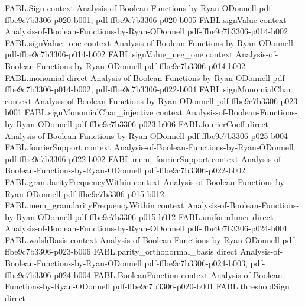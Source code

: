 \begin{theorem}
\label{FABL.hasCondorcetWinner_iff_isNAE3}
\leanok
{}
\proofstep
  {FABL.Sign}
  {context}
  {Analysis-of-Boolean-Functions-by-Ryan-ODonnell}
  {pdf-ffbe9c7b3306-p020-b001,
    pdf-ffbe9c7b3306-p020-b005}
\proofstep
  {FABL.signValue}
  {context}
  {Analysis-of-Boolean-Functions-by-Ryan-ODonnell}
  {pdf-ffbe9c7b3306-p014-b002}
\proofstep
  {FABL.signValue_one}
  {context}
  {Analysis-of-Boolean-Functions-by-Ryan-ODonnell}
  {pdf-ffbe9c7b3306-p014-b002}
\proofstep
  {FABL.signValue_neg_one}
  {context}
  {Analysis-of-Boolean-Functions-by-Ryan-ODonnell}
  {pdf-ffbe9c7b3306-p014-b002}
\proofstep
  {FABL.monomial}
  {direct}
  {Analysis-of-Boolean-Functions-by-Ryan-ODonnell}
  {pdf-ffbe9c7b3306-p014-b002,
    pdf-ffbe9c7b3306-p022-b004}
\proofstep
  {FABL.signMonomialChar}
  {context}
  {Analysis-of-Boolean-Functions-by-Ryan-ODonnell}
  {pdf-ffbe9c7b3306-p023-b001}
\proofstep
  {FABL.signMonomialChar_injective}
  {context}
  {Analysis-of-Boolean-Functions-by-Ryan-ODonnell}
  {pdf-ffbe9c7b3306-p023-b006}
\proofstep
  {FABL.fourierCoeff}
  {direct}
  {Analysis-of-Boolean-Functions-by-Ryan-ODonnell}
  {pdf-ffbe9c7b3306-p025-b004}
\proofstep
  {FABL.fourierSupport}
  {context}
  {Analysis-of-Boolean-Functions-by-Ryan-ODonnell}
  {pdf-ffbe9c7b3306-p022-b002}
\proofstep
  {FABL.mem_fourierSupport}
  {context}
  {Analysis-of-Boolean-Functions-by-Ryan-ODonnell}
  {pdf-ffbe9c7b3306-p022-b002}
\proofstep
  {FABL.granularityFrequencyWithin}
  {context}
  {Analysis-of-Boolean-Functions-by-Ryan-ODonnell}
  {pdf-ffbe9c7b3306-p015-b012}
\proofstep
  {FABL.mem_granularityFrequencyWithin}
  {context}
  {Analysis-of-Boolean-Functions-by-Ryan-ODonnell}
  {pdf-ffbe9c7b3306-p015-b012}
\proofstep
  {FABL.uniformInner}
  {direct}
  {Analysis-of-Boolean-Functions-by-Ryan-ODonnell}
  {pdf-ffbe9c7b3306-p024-b001}
\proofstep
  {FABL.walshBasis}
  {context}
  {Analysis-of-Boolean-Functions-by-Ryan-ODonnell}
  {pdf-ffbe9c7b3306-p023-b006}
\proofstep
  {FABL.parity_orthonormal_basis}
  {direct}
  {Analysis-of-Boolean-Functions-by-Ryan-ODonnell}
  {pdf-ffbe9c7b3306-p024-b003,
    pdf-ffbe9c7b3306-p024-b004}
\proofstep
  {FABL.BooleanFunction}
  {context}
  {Analysis-of-Boolean-Functions-by-Ryan-ODonnell}
  {pdf-ffbe9c7b3306-p020-b001}
\proofstep
  {FABL.thresholdSign}
  {direct}

\end{theorem}
